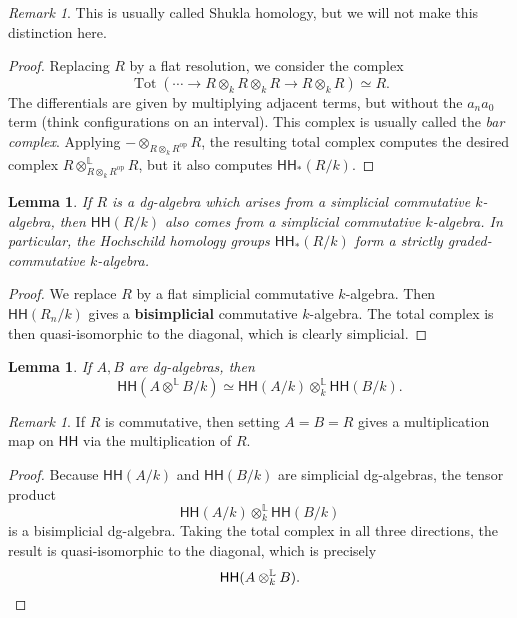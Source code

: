 \documentclass[10pt, oneside]{memoir}
\newtheorem{lem}[thm]{Lemma}
\theoremstyle{definition}
\theoremstyle{remark}
\newtheorem{rmk}[thm]{Remark}
\theoremstyle{plain}
\theoremstyle{definition}
\theoremstyle{remark}
\renewcommand{\L}{\mathbb{L}}
\newcommand{\ms}[1]{\mathsf{#1}}
\newcommand{\1}{\mathbf{1}}
\newcommand{\2}{\mathbf{2}}
\newcommand{\3}{\mathbf{3}}
\newcommand{\HH}{\ms{HH}}
\DeclareMathOperator{\op}{op}
\DeclareMathOperator{\Tot}{Tot}
\begin{document}
\begin{rmk}
    This is usually called Shukla homology, but we will not make this distinction here.
\end{rmk}

\begin{proof}
    Replacing $R$ by a flat resolution, we consider the complex
    \[ \Tot(\cdots \to R \otimes_k R \otimes_k R \to R \otimes_k R) \simeq R. \]
    The differentials are given by multiplying adjacent terms, but without the $a_n a_0$ term (think configurations on an interval). This complex is usually called the \textit{bar complex}. Applying $- \otimes_{R \otimes_k R^{\op}} R$, the resulting total complex computes the desired complex $R \otimes_{R \otimes_k R^{\op}}^{\L} R$, but it also computes $\HH_*(R/k)$.
\end{proof}

\begin{lem}
    If $R$ is a dg-algebra which arises from a simplicial commutative $k$-algebra, then $\HH(R/k)$ also comes from a simplicial commutative $k$-algebra. In particular, the Hochschild homology groups $\HH_*(R/k)$ form a strictly graded-commutative $k$-algebra.
\end{lem}

\begin{proof}
    We replace $R$ by a flat simplicial commutative $k$-algebra. Then $\HH(R_n/k)$ gives a \textbf{bisimplicial} commutative $k$-algebra. The total complex is then quasi-isomorphic to the diagonal, which is clearly simplicial.
\end{proof}

\begin{lem}
    If $A, B$ are dg-algebras, then
    \[ \HH(A \otimes^{\L} B/k) \simeq \HH(A/k) \otimes_k^{\L} \HH(B/k). \]
\end{lem}

\begin{rmk}
    If $R$ is commutative, then setting $A=B=R$ gives a multiplication map on $\HH$ via the multiplication of $R$.
\end{rmk}

\begin{proof}
    Because $\HH(A/k)$ and $\HH(B/k)$ are simplicial dg-algebras, the tensor product
    \[ \HH(A/k) \otimes_k^{\L} \HH(B/k) \]
    is a bisimplicial dg-algebra. Taking the total complex in all three directions, the result is quasi-isomorphic to the diagonal, which is precisely
    \[ \HH(A\otimes_k^{\L} B). \qedhere \]
\end{proof}
\end{document}
